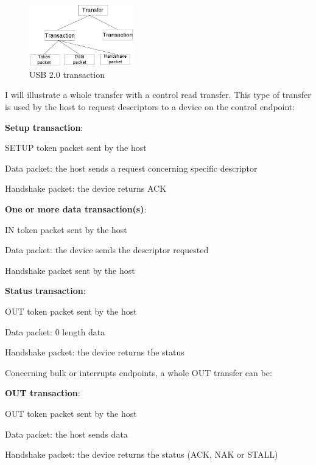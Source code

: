 \documentclass[pdftex,10pt,a4paper]{report}
\newenvironment{packed_item}{
\begin{itemize}
  \setlength{\itemsep}{1pt}
  \setlength{\parskip}{0pt}
  \setlength{\parsep}{0pt}
}{\end{itemize}}
\begin{document}
\begin{figure}[h!]
		\centering
		\includegraphics[width=0.4\textwidth]{./transfer.png}
		\caption{USB 2.0 transaction}
		\label{USB 2.0 transaction}
\end{figure}

I will illustrate a whole transfer with a control read transfer. This type of transfer is used by the host to request descriptors to a device on the control endpoint:
\begin{packed_item}
	\item \textbf{Setup transaction}:
	\begin{packed_item}
		\item SETUP token packet sent by the host
		\item Data packet: the host sends a request concerning specific descriptor
		\item Handshake packet: the device returns ACK
	\end{packed_item}
	
	\item \textbf{One or more data transaction(s)}:
	\begin{packed_item}
		\item IN token packet sent by the host
		\item Data packet: the device sends the descriptor requested
		\item Handshake packet sent by the host
	\end{packed_item}
	
	
	\item \textbf{Status transaction}:
	\begin{packed_item}
		\item OUT token packet sent by the host
		\item Data packet: 0 length data
		\item Handshake packet: the device returns the status
	\end{packed_item}
	
\end{packed_item}


Concerning bulk or interrupts endpoints, a whole OUT transfer can be:
\begin{packed_item}
	\item \textbf{OUT transaction}:
	\begin{packed_item}
		\item OUT token packet sent by the host
		\item Data packet: the host sends data
		\item Handshake packet: the device returns the status (ACK, NAK or STALL)
	\end{packed_item}
\end{packed_item}
\end{document}
